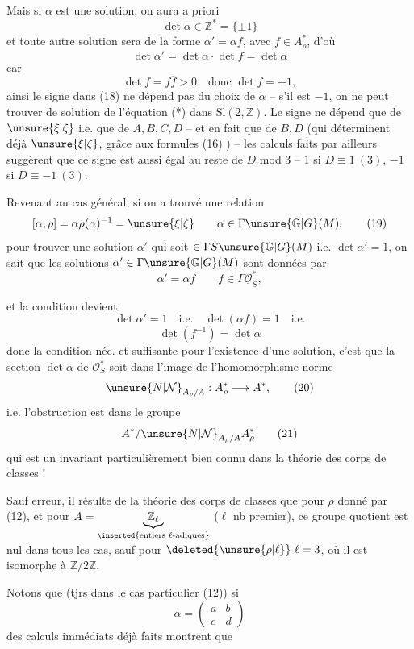 

Mais si $\alpha$ est une solution, on aura a priori
\[
\det\alpha\in\mathbb Z^*=\{\pm1\}
\tag{18}
\]
et toute autre solution sera de la forme
$\alpha'=\alpha f$, avec $f\in A_\rho^*$, d'où
\[
\det\alpha'=\det\alpha\cdot\det f=\det\alpha
\]
car
\[
\det f=f\overline f>0\quad\text{donc }\det f=+1,
\]
ainsi le signe dans (18)  ne dépend pas
du choix de $\alpha$ -- s'il est $-1$, on ne peut
trouver de solution de l'équation (*) dans
$\mathrm{Sl}(2,\mathbb Z)$. Le signe ne dépend que de $\unsure{\xi|\zeta}$ i.e. que
de $A,B,C,D$ -- et en fait  que de $B,D$
(qui déterminent déjà $\unsure{\xi|\zeta}$, grâce aux
formules (16) ) -- les calculs faits par ailleurs
suggèrent que ce signe est aussi  égal au
reste de $D$ mod 3 -- $1$ si $D\equiv1\ (3)$, $-1$ si
$D\equiv-1\ (3)$.

Revenant au cas général, si on a trouvé
une relation
\[
[\alpha,\rho]=\alpha\rho(\alpha)^{-1}=\unsure{\xi|\zeta}
\qquad\alpha\in\Gamma\unsure{\mathbb G|G}(M),
\tag{19}
\]
pour  trouver une solution $\alpha'$ qui
soit $\in\Gamma S\unsure{\mathbb G|G}(M)$ i.e. $\det\alpha'=1$, on sait que
les solutions $\alpha'\in\Gamma\unsure{\mathbb G|G}(M)$  sont données par
\[
\alpha'=\alpha f\qquad f\in\Gamma\underline{\mathcal O}_S^*,
\]



et la condition devient
\[
\det\alpha'=1\quad\text{i.e.}\quad\det(\alpha f)=1\quad\text{i.e.}
\]
\[
\det(f^{-1})=\det\alpha
\]
donc la condition néc. et suffisante pour l'existence
d'une solution, c'est que la section $\det\alpha$ de
$\mathcal O_S^*$ soit dans l'image de l'homomorphisme
norme
\[
\unsure{N|\mathcal N}_{A_\rho/A}:A_\rho^*\longrightarrow A^*,
\tag{20}
\]
i.e. l'obstruction est dans le groupe
\[
A^*/\unsure{N|\mathcal N}_{A_\rho/A}A_\rho^*
\tag{21}
\]
qui est un invariant particulièrement bien
connu dans la théorie des corps de classes !

Sauf erreur, il résulte de la théorie des corps
de classes que pour $\rho$ donné par (12),
et pour $A=\underbrace{\mathbb Z_\ell}_{\inserted{\text{entiers }\ell\text{-adiques}}}$ ($\ell$ nb premier), ce
groupe quotient est nul dans tous les cas,
sauf pour $\deleted{\unsure{\rho|\ell}}\ \ell=3$, où il est isomorphe à
$\mathbb Z/2\mathbb Z$. 

Notons que (tjrs dans le cas particulier (12))
si
\[
\alpha=\begin{pmatrix}a&b\\c&d\end{pmatrix}
\tag{22}
\]
des calculs immédiats déjà faits montrent que

